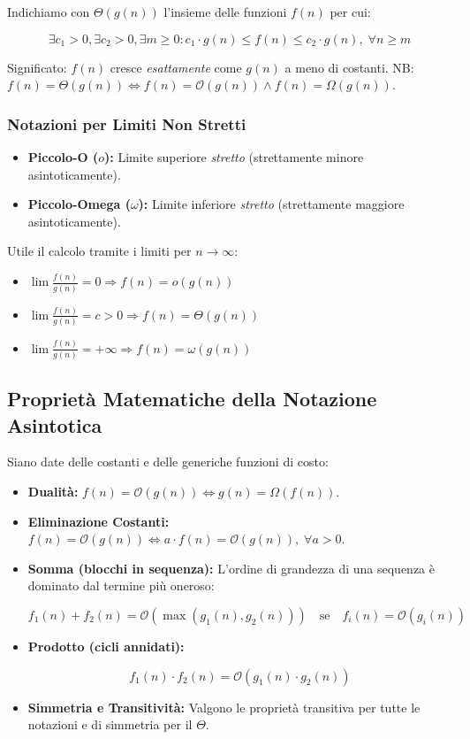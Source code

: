 \documentclass[12pt, a4paper]{article}
\begin{document}
\begin{tcolorbox}[colback=lightergray!10, colframe=tocsec, title=\textbf{Notazione $\Theta$ (Theta) - Limite Stretto}]
Indichiamo con $\Theta(g(n))$ l'insieme delle funzioni $f(n)$ per cui:


$$\exists c_1 > 0, \exists c_2 > 0, \exists m \ge 0 : c_1 \cdot g(n) \le f(n) \le c_2 \cdot g(n),\; \forall n \ge m$$


Significato: $f(n)$ cresce \textit{esattamente} come $g(n)$ a meno di costanti.
NB: $f(n) = \Theta(g(n)) \Leftrightarrow f(n) = \mathcal{O}(g(n)) \land f(n) = \Omega(g(n))$.
\end{tcolorbox}

\subsubsection{Notazioni per Limiti Non Stretti}
\begin{itemize}
\item \textbf{Piccolo-O ($o$):} Limite superiore \textit{stretto} (strettamente minore asintoticamente).
\item \textbf{Piccolo-Omega ($\omega$):} Limite inferiore \textit{stretto} (strettamente maggiore asintoticamente).
\end{itemize}
Utile il calcolo tramite i limiti per $n \rightarrow \infty$:
\begin{itemize}
\item $\lim \frac{f(n)}{g(n)} = 0 \Rightarrow f(n) = o(g(n))$
\item $\lim \frac{f(n)}{g(n)} = c > 0 \Rightarrow f(n) = \Theta(g(n))$
\item $\lim \frac{f(n)}{g(n)} = +\infty \Rightarrow f(n) = \omega(g(n))$
\end{itemize}

\subsection{Proprietà Matematiche della Notazione Asintotica}
Siano date delle costanti e delle generiche funzioni di costo:

\begin{itemize}
\item \textbf{Dualità:} $f(n) = \mathcal{O}(g(n)) \Leftrightarrow g(n) = \Omega(f(n))$.
\item \textbf{Eliminazione Costanti:} $f(n) = \mathcal{O}(g(n)) \Leftrightarrow a \cdot f(n) = \mathcal{O}(g(n)),\; \forall a > 0$.
\item \textbf{Somma (blocchi in sequenza):} L'ordine di grandezza di una sequenza è dominato dal termine più oneroso:


$$f_1(n) + f_2(n) = \mathcal{O}(\max(g_1(n), g_2(n))) \quad \text{se} \quad f_i(n) = \mathcal{O}(g_i(n))$$


\item \textbf{Prodotto (cicli annidati):}


$$f_1(n) \cdot f_2(n) = \mathcal{O}(g_1(n) \cdot g_2(n))$$


\item \textbf{Simmetria e Transitività:} Valgono le proprietà transitiva per tutte le notazioni e di simmetria per il $\Theta$.
\end{itemize}
\end{document}
